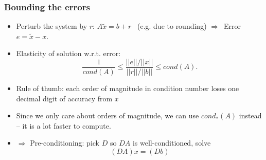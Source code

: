 \documentclass[bigger]{beamer}
\begin{document}
\begin{frame}%

\frametitle{Bounding the errors}

\begin{itemize}
\item Perturb the system by $r$: $A\tilde{x}=b+r$ \ (e.g. due to rounding)%
\newline
$\Longrightarrow $\ Error $e=\tilde{x}-x$.

\item Elasticity of solution w.r.t. error:%
\begin{equation*}
\frac{1}{cond(A)}\leq \frac{||e||/||x||}{||r||/||b||}\leq cond(A).
\end{equation*}

\item Rule of thumb: each order of magnitude in condition number loses one
decimal digit of accuracy from $x$

\item Since we only care about orders of magnitude, \newline
we can use $cond_{\ast }(A)$ instead -- it is a lot faster to compute.

\item $\Rightarrow $ Pre-conditioning: pick $D$ so $DA$ is well-conditioned,
solve 
\begin{equation*}
\left( DA\right) x=\left( Db\right)
\end{equation*}
\end{itemize}

\end{frame}%
\end{document}
